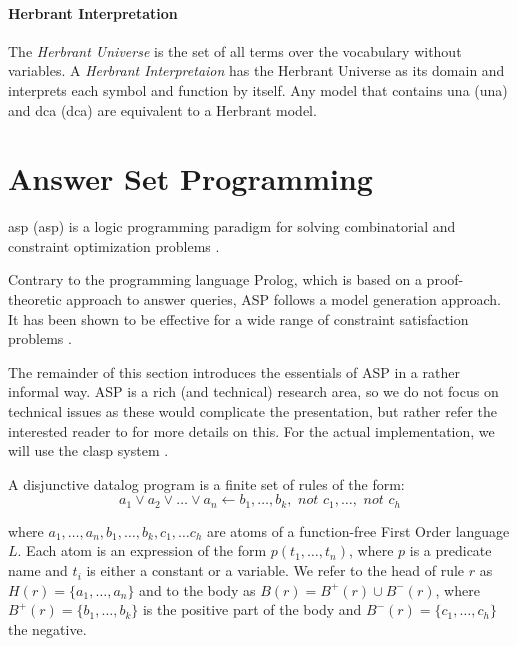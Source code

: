 \paragraph{Herbrant Interpretation} The \textit{Herbrant Universe} is the set of all terms over the vocabulary without variables. A \textit{Herbrant Interpretaion} has the Herbrant Universe as its domain and interprets each symbol and function by itself. Any model that contains \acrlong{una} (\acrshort{una}) \parencite{UNA} and \acrlong{dca} (\acrshort{dca}) \parencite{DCA} are equivalent to a Herbrant model.


\section{Answer Set Programming}
\acrlong{asp} (\acrshort{asp}) is a logic programming paradigm for solving combinatorial and constraint optimization problems \parencite{whatisasp}.

Contrary to the programming language Prolog, which is based on a proof-theoretic approach to answer queries, ASP follows a model generation approach. It has been shown to be effective for a wide range of constraint satisfaction problems \parencite{ASPbook}.

The remainder of this section introduces the essentials of ASP in a rather informal way. ASP is a rich (and technical) research area, so we do not focus on technical issues as these would complicate the presentation, but rather refer the interested reader to \textcite{ASPbook,eiter,leone,DBLP:conf/aaai/Lifschitz08} for more details on this. For the actual implementation, we will use the clasp system \parencite{ASPbook,BrewkaCACM}.

\begin{definition}
  A disjunctive datalog program is a finite set of rules of the form: 
  \begin{equation*}
    a_1 \vee a_2 \vee \dots \vee a_n \leftarrow b_1, \dots, b_k, \textit{ not }c_1,\dots,\textit{ not }c_h 
  \end{equation*}
\end{definition}
where $a_1, \dots, a_n, b_1, \dots, b_k,c_1, \dots c_h$ are atoms of a function-free First Order language $L$. Each atom is an expression of the form $p(t_1,\ldots,t_n)$, where $p$ is a predicate name and $t_i$ is either a constant or a variable. We refer to the head of rule $r$ as $H(r) = \{a_1,\dots,a_n\}$ and to the body as $B(r) = B^{+}(r) \cup B^{-}(r)$, where $B^{+}(r) = \{ b_1, \dots, b_k \}$ is the positive part of the body and $B^{-}(r) = \{ c_1, \dots, c_h \}$ the negative. 

